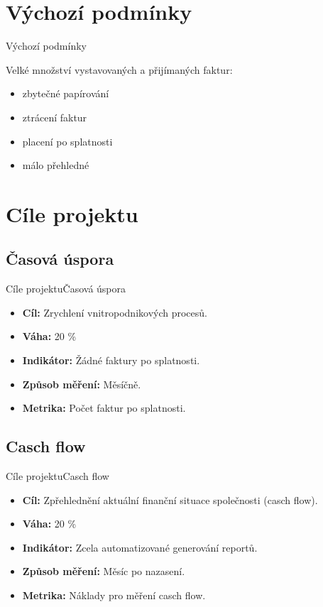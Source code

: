 \documentclass[10pt]{beamer}
\begin{document}
\section{Výchozí podmínky}

\begin{frame}{Výchozí podmínky}

	Velké množství vystavovaných a přijímaných faktur:
	
	\begin{itemize}
		\item zbytečné papírování
		\item ztrácení faktur
		\item placení po splatnosti
		\item málo přehledné
	\end{itemize}
\end{frame}

\section{Cíle projektu}

\subsection*{Časová úspora}

\begin{frame}{Cíle projektu}{Časová úspora}
	\begin{itemize}
		\item \textbf{Cíl:} Zrychlení vnitropodnikových procesů.
		\item \textbf{Váha:} 20 \%
		\item \textbf{Indikátor:} Žádné faktury po splatnosti.
		\item \textbf{Způsob měření:} Měsíčně.
		\item \textbf{Metrika:} Počet faktur po splatnosti.
	\end{itemize}
\end{frame}

\subsection*{Casch flow}

\begin{frame}{Cíle projektu}{Casch flow}
	\begin{itemize}
		\item \textbf{Cíl:} Zpřehlednění aktuální finanční situace společnosti (casch flow).
		\item \textbf{Váha:} 20 \%
		\item \textbf{Indikátor:} Zcela automatizované generování reportů.
		\item \textbf{Způsob měření:} Měsíc po nazasení.
		\item \textbf{Metrika:} Náklady pro měření casch flow.
	\end{itemize}
\end{frame}
\end{document}
